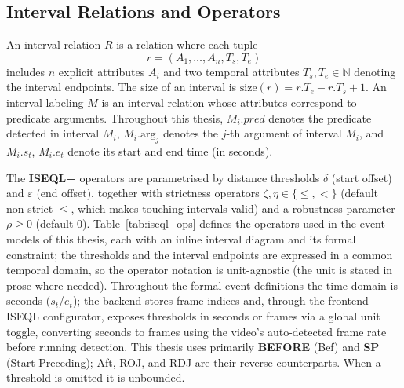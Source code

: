 \subsection{Interval Relations and Operators}

An interval relation $R$ is a relation where each tuple
\[
 r = (A_1, \ldots, A_n, T_s, T_e)
\]
includes $n$ explicit attributes $A_i$ and two temporal attributes $T_s, T_e \in \mathbb{N}$ denoting the interval endpoints. The size of an interval is $\mathrm{size}(r) = r.T_e - r.T_s + 1$. An interval labeling $M$ is an interval relation whose attributes correspond to predicate arguments. Throughout this thesis, $M_i.pred$ denotes the predicate detected in interval $M_i$, $M_i.\mathrm{arg}_j$ denotes the $j$-th argument of interval $M_i$, and $M_i.s_t$, $M_i.e_t$ denote its start and end time (in seconds).

The \textbf{ISEQL+} operators are parametrised by distance thresholds $\delta$ (start offset) and $\varepsilon$ (end offset), together with strictness operators $\zeta, \eta \in \{\le, <\}$ (default non-strict $\le$, which makes touching intervals valid) and a robustness parameter $\rho \ge 0$ (default 0). Table~\ref{tab:iseql_ops} defines the operators used in the event models of this thesis, each with an inline interval diagram and its formal constraint; the thresholds and the interval endpoints are expressed in a common temporal domain, so the operator notation is unit-agnostic (the unit is stated in prose where needed). Throughout the formal event definitions the time domain is seconds ($s_t$/$e_t$); the backend stores frame indices and, through the frontend ISEQL configurator, exposes thresholds in seconds or frames via a global unit toggle, converting seconds to frames using the video's auto-detected frame rate before running detection. This thesis uses primarily \textbf{BEFORE} (Bef) and \textbf{SP} (Start Preceding); Aft, ROJ, and RDJ are their reverse counterparts. When a threshold is omitted it is unbounded.

